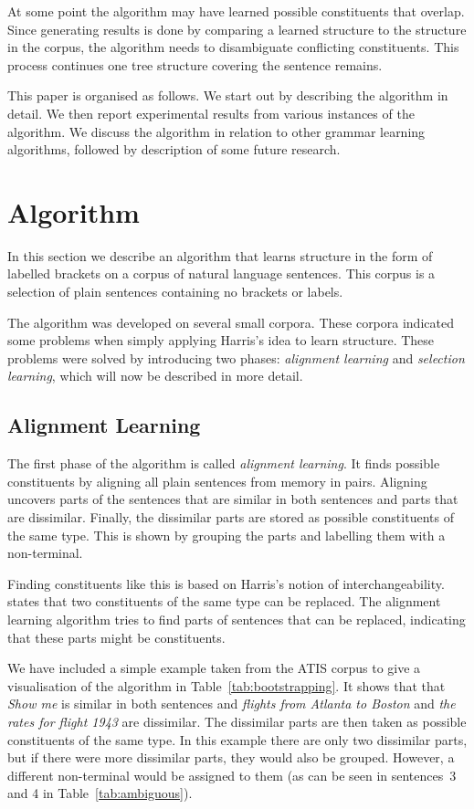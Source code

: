 \documentclass[letterpaper,mlapa]{article}
\begin{document}
At some point the algorithm may have learned possible constituents that overlap.
Since generating results is done by comparing a learned structure to the
structure in the corpus, the algorithm needs to disambiguate conflicting
constituents. This process continues one tree structure covering the sentence
remains.

This paper is organised as follows. We start out by describing the algorithm in
detail. We then report experimental results from various instances of the
algorithm. We discuss the algorithm in relation to other grammar learning
algorithms, followed by description of some future research.


\section{Algorithm}

In this section we describe an algorithm that learns structure in the form of
labelled brackets on a corpus of natural language sentences. This corpus is a
selection of plain sentences containing no brackets or labels.

The algorithm was developed on several small corpora. These corpora indicated
some problems when simply applying Harris's idea to learn structure. These
problems were solved by introducing two phases: \emph{alignment learning}
and \emph{selection learning}, which will now be described in more detail.


\subsection{Alignment Learning}

The first phase of the algorithm is called \emph{alignment learning}. It 
finds possible constituents by aligning all plain sentences from memory in
pairs. Aligning uncovers parts of the sentences that are similar in both
sentences and parts that are dissimilar. Finally, the dissimilar parts are
stored as possible constituents of the same type. This is shown by grouping
the parts and labelling them with a non-terminal.

Finding constituents like this is based on Harris's notion of
interchangeability.  states that two constituents of
the same type can be replaced. The alignment learning algorithm tries to find
parts of sentences that can be replaced, indicating that these parts might be
constituents.

We have included a simple example taken from the ATIS corpus to give a
visualisation of the algorithm in Table~\ref{tab:bootstrapping}. It shows that
that \textit{Show me} is similar in both sentences and \textit{flights from
Atlanta to Boston} and \textit{the rates for flight 1943} are dissimilar. The
dissimilar parts are then taken as possible constituents of the same type. In
this example there are only two dissimilar parts, but if there were more
dissimilar parts, they would also be grouped. However, a different
non-terminal would be assigned to them (as can be seen in sentences~3 and 4 in
Table~\ref{tab:ambiguous}).
\end{document}

